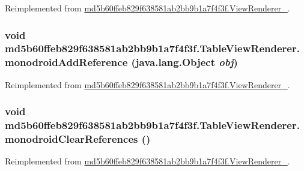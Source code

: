Reimplemented from \hyperlink{classmd5b60ffeb829f638581ab2bb9b1a7f4f3f_1_1_view_renderer__2_a0898cf56fa9a49b653470eaf1608e77}{md5b60ffeb829f638581ab2bb9b1a7f4f3f.ViewRenderer\_}.\hypertarget{classmd5b60ffeb829f638581ab2bb9b1a7f4f3f_1_1_table_view_renderer_f259e91ecf2a98fa15f6cfa21ba30c72}{
\subsubsection[{monodroidAddReference}]{\setlength{\rightskip}{0pt plus 5cm}void md5b60ffeb829f638581ab2bb9b1a7f4f3f.TableViewRenderer.monodroidAddReference (java.lang.Object {\em obj})}}
\label{classmd5b60ffeb829f638581ab2bb9b1a7f4f3f_1_1_table_view_renderer_f259e91ecf2a98fa15f6cfa21ba30c72}




Reimplemented from \hyperlink{classmd5b60ffeb829f638581ab2bb9b1a7f4f3f_1_1_view_renderer__2_64ca8244a89f60a47c173d9c0b15d610}{md5b60ffeb829f638581ab2bb9b1a7f4f3f.ViewRenderer\_}.\hypertarget{classmd5b60ffeb829f638581ab2bb9b1a7f4f3f_1_1_table_view_renderer_79caaf19be816b7fff9c8bc03b0cc805}{
\subsubsection[{monodroidClearReferences}]{\setlength{\rightskip}{0pt plus 5cm}void md5b60ffeb829f638581ab2bb9b1a7f4f3f.TableViewRenderer.monodroidClearReferences ()}}
\label{classmd5b60ffeb829f638581ab2bb9b1a7f4f3f_1_1_table_view_renderer_79caaf19be816b7fff9c8bc03b0cc805}




Reimplemented from \hyperlink{classmd5b60ffeb829f638581ab2bb9b1a7f4f3f_1_1_view_renderer__2_dae20979ac761a65aa60c9b427509c37}{md5b60ffeb829f638581ab2bb9b1a7f4f3f.ViewRenderer\_}.

